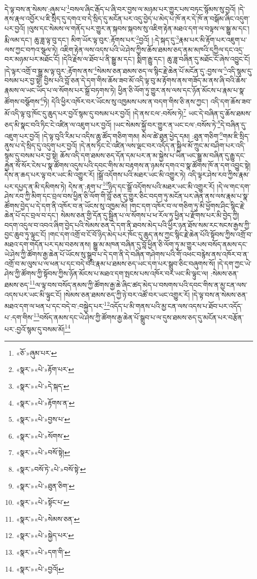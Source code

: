 དེ་ལྟ་བས་ན་སེམས་:ཞུམ་པ་\footnote{«ཅོ་»ཞུམ་པར་}བསལ་ཞིང་རྒོད་པ་ཞི་བར་བྱས་ལ་མཉམ་པར་གྱུར་པས་བཏང་སྙོམས་སུ་བྱའོ། །དེ་ནས་རྣལ་འབྱོར་པ་ཇི་སྲིད་དུ་དགའ་བ་དེ་སྲིད་དུ་མངོན་པར་འདུ་བྱེད་པ་མེད་པ་ཁོ་ནར་དེ་ཁོ་ན་བསྒོམ་ཞིང་འདུག་པར་བྱའོ། །ལུས་དང་སེམས་ལ་གནོད་པར་གྱུར་ན་སྐབས་སྐབས་སུ་འཇིག་རྟེན་མཐའ་དག་ལ་བལྟས་ལ་སྒྱུ་མ་དང་། རྨི་ལམ་དང་། ཆུ་ཟླ་ལྟ་བུ་དང་། མིག་ཡོར་ལྟ་བུར་:རྟོགས་པར་\footnote{«སྣར་»«པེ་»རྟོག་པར་}བྱའོ། །:དེ་སྐད་དུ་\footnote{«སྣར་»«པེ་»དེ་སྐད་}རྣམ་པར་མི་རྟོག་པར་འཇུག་པ་ལས་ཀྱང་བཀའ་སྩལ་ཏེ། འཇིག་རྟེན་ལས་འདས་པའི་ཡེ་ཤེས་ཀྱིས་ཆོས་ཐམས་ཅད་ནམ་མཁའི་དཀྱིལ་དང་འདྲ་བར་མཉམ་པར་མཐོང་ངོ། །དེའི་རྗེས་ལ་ཐོབ་པ་ནི་སྒྱུ་མ་དང་། སྨིག་རྒྱུ་དང་། ཆུ་ཟླ་བཞིན་དུ་མཐོང་ངོ་ཞེས་འབྱུང་ངོ། །དེ་ལྟར་འགྲོ་བ་སྒྱུ་མ་ལྟ་བུར་:རྟོགས་ནས་\footnote{«སྣར་»«པེ་»རྟོགས་ན་}སེམས་ཅན་ཐམས་ཅད་ལ་སྙིང་རྗེ་ཆེན་པོ་མངོན་དུ་:བྱས་ལ་\footnote{«སྣར་»«པེ་»བྱས་པ་}འདི་སྙམ་དུ་བསམ་པར་བྱ་སྟེ། བྱིས་པའི་བློ་ཅན་དེ་དག་གིས་ཆོས་ཟབ་མོ་འདི་ལྟ་བུ་མ་རྟོགས་ནས་གཟོད་མ་ནས་ཞི་བའི་ཆོས་རྣམས་ལ་ཡང་ཡོད་པ་ལ་སོགས་པར་སྒྲོ་བཏགས་ཏེ། ཕྱིན་ཅི་ལོག་ཏུ་གྱུར་ནས་ལས་དང་ཉོན་མོངས་པ་རྣམ་པ་སྣ་ཚོགས་བསྩོགས་\footnote{«སྣར་»«པེ་»སོགས་}ཏེ། དེའི་ཕྱིར་འཁོར་བར་ཡོངས་སུ་འཁྱམས་པས་ན་བདག་གིས་ཅི་ནས་ཀྱང་། འདི་དག་ཆོས་ཟབ་མོ་འདི་ལྟ་བུ་ཁོང་དུ་ཆུད་པར་བྱའོ་སྙམ་དུ་བསམ་པར་བྱའོ། །དེ་ནས་ངལ་:བསོས་ཏེ།\footnote{«སྣར་»«པེ་»བསོ་སྟེ།} ཡང་དེ་བཞིན་དུ་ཆོས་ཐམས་ཅད་མི་སྣང་བའི་ཏིང་ངེ་འཛིན་ལ་འཇུག་པར་བྱའོ། །ཡང་སེམས་སྐྱོ་བར་གྱུར་ན་ཡང་ངལ་:བསོས་ཏེ་\footnote{«སྣར་»བསོ་ཏེ་«པེ་»བསོ་སྟེ་}དེ་བཞིན་དུ་འཇུག་པར་བྱའོ། །དེ་ལྟ་བུའི་རིམ་པ་འདིས་ཆུ་ཚོད་གཅིག་གམ། མེལ་ཚེ་ཐུན་ཕྱེད་དམ། :ཐུན་གཅིག་\footnote{«སྣར་»«པེ་»ཐུན་ཅིག་}གམ་ཇི་སྲིད་ནུས་པ་དེ་སྲིད་དུ་འདུག་པར་བྱའོ། །དེ་ནས་ཏིང་ངེ་འཛིན་ལས་ལྡང་བར་འདོད་ན་སྐྱིལ་མོ་ཀྲུང་མ་བཤིག་པར་འདི་སྙམ་དུ་བསམ་པར་བྱ་སྟེ། ཆོས་འདི་དག་ཐམས་ཅད་དོན་དམ་པར་ན་མ་སྐྱེས་པ་ཡིན་ཡང་སྒྱུ་མ་བཞིན་དུ་རྒྱུ་དང་རྐྱེན་སོ་སོར་ངེས་པ་སྣ་ཚོགས་འདུས་པའི་དབང་གིས་མ་བརྟགས་ན་ཉམས་དགའ་བ་སྣ་ཚོགས་ཁོ་ན་དག་འབྱུང་སྟེ། དེས་ན་ཆད་པར་ལྟ་བར་ཡང་མི་འགྱུར་རོ། །སྒྲོ་འདོགས་པའི་མཐར་ཡང་མི་འགྱུར་ཏེ། འདི་ལྟར་ཤེས་རབ་ཀྱིས་རྣམ་པར་དཔྱད་ན་མི་དམིགས་ཏེ། དེས་ན་:རྟག་པ་\footnote{«སྣར་»«པེ་»སྟོང་པ་}ཉིད་དང་སྒྲོ་འདོགས་པའི་མཐར་ཡང་མི་འགྱུར་རོ། །དེ་ལ་གང་དག་ཤེས་རབ་ཀྱི་མིག་དང་བྲལ་བས་ཕྱིན་ཅི་ལོག་གི་བློ་ཅན་དུ་གྱུར་ཅིང་བདག་ཏུ་མངོན་པར་ཞེན་ནས་ལས་རྣམ་པ་སྣ་ཚོགས་བྱེད་པ་དེ་དག་ནི་འཁོར་བ་ན་ཡོངས་སུ་འཁྱམ་མོ། །གང་དག་འཁོར་བ་ལ་གཅིག་ཏུ་མི་ཕྱོགས་ཤིང་སྙིང་རྗེ་ཆེན་པོ་དང་བྲལ་བ་དང་། སེམས་ཅན་གྱི་དོན་དུ་སྦྱིན་པ་ལ་སོགས་པ་ཕ་རོལ་ཏུ་ཕྱིན་པ་རྫོགས་པར་མི་བྱེད་ཀྱི། བདག་འདུལ་བ་འབའ་ཞིག་བྱེད་པའི་སེམས་ཅན་དེ་དག་ནི་ཐབས་མེད་པའི་ཕྱིར་ཉན་ཐོས་སམ་རང་སངས་རྒྱས་ཀྱི་བྱང་ཆུབ་ཏུ་ལྟུང་ངོ། །གང་དག་འགྲོ་བ་ངོ་བོ་ཉིད་མེད་པར་ཁོང་དུ་ཆུད་ནས་ཀྱང་སྙིང་རྗེ་ཆེན་པོའི་སྟོབས་ཀྱིས་འགྲོ་བ་མཐའ་དག་གདོན་པར་དམ་བཅས་ནས། སྒྱུ་མ་མཁན་བཞིན་དུ་བློ་ཕྱིན་ཅི་ལོག་ཏུ་མ་གྱུར་པས་བསོད་ནམས་དང་ཡེ་ཤེས་ཀྱི་ཚོགས་རྒྱ་ཆེན་པོ་ཡོངས་སུ་སྒྲུབ་པ་དེ་དག་ནི་དེ་བཞིན་གཤེགས་པའི་གོ་འཕང་བརྙེས་ནས་འཁོར་བ་ན་འགྲོ་བ་མ་ལུས་པ་ལ་ཕན་པ་དང་བདེ་བའི་རྣམ་པ་ཐམས་ཅད་ཡང་དག་པར་སྒྲུབ་ཅིང་བཞུགས་སོ། །དེ་དག་ཀྱང་ཡེ་ཤེས་ཀྱི་ཚོགས་ཀྱི་སྟོབས་ཀྱིས་ཉོན་མོངས་པ་མཐའ་དག་སྤངས་པས་འཁོར་བར་ཡང་མི་ལྟུང་ལ། :སེམས་ཅན་ཐམས་ཅད་\footnote{«སྣར་»«པེ་»སེམས་ཅན་}ལ་ལྟ་བས་བསོད་ནམས་ཀྱི་ཚོགས་རྒྱ་ཆེ་ཞིང་ཚད་མེད་པ་བསགས་པའི་དབང་གིས་ན་མྱ་ངན་ལས་འདས་པར་ཡང་མི་ལྟུང་ངོ། །སེམས་ཅན་ཐམས་ཅད་ཀྱི་ཉེ་བར་འཚོ་བར་ཡང་འགྱུར་རོ། །དེ་ལྟ་བས་ན་སེམས་ཅན་མཐའ་དག་ལ་ཕན་པ་དང་བདེ་བ་:བསྐྱེད་པར་\footnote{«སྣར་»«པེ་»སྐྱེད་པར་}འདོད་པ་མི་གནས་པའི་མྱ་ངན་ལས་འདས་པ་ཐོབ་པར་འདོད་པ་:དག་གིས་\footnote{«སྣར་»«པེ་»དག་གི་}བསོད་ནམས་དང་ཡེ་ཤེས་ཀྱི་ཚོགས་རྒྱ་ཆེན་པོ་སྒྲུབ་པ་ལ་དུས་ཐམས་ཅད་དུ་མངོན་པར་བརྩོན་པར་:བྱའོ་སྙམ་དུ་བསམ་མོ།\footnote{«སྣར་»«པེ་»བྱའོ།} 